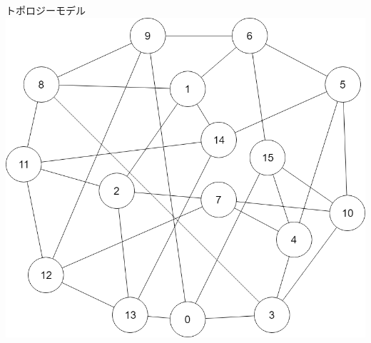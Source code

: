 \documentclass[12pt, dvipdfmx]{beamer}
\begin{document}
\begin{frame}
\begin{columns}[totalwidth=\textwidth]
\begin{exampleblock}{トポロジーモデル}
				\includegraphics[width=\columnwidth]{Network.png}

			\end{exampleblock}
		\end{columns}
\end{frame}
\end{document}
